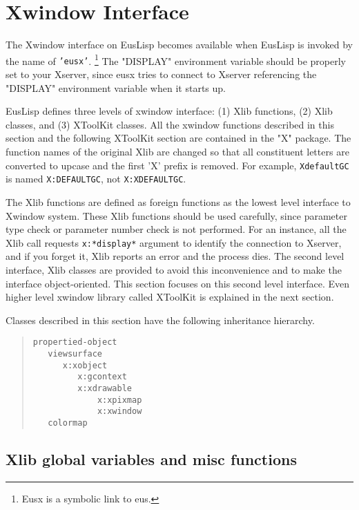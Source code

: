 \section{Xwindow Interface}
The Xwindow interface on EusLisp becomes available when EusLisp is
invoked by the name of {\tt 'eusx'}.
\footnote{Eusx is a symbolic link to eus.}
The "DISPLAY" environment variable should be properly set to your Xserver,
since eusx tries to connect to Xserver referencing
the "DISPLAY" environment variable when it starts up.

EusLisp defines three levels of xwindow interface:
(1) Xlib functions, (2) Xlib classes, and (3) XToolKit classes.
All the xwindow functions described in this section and the following
XToolKit section are contained in the "X" package.
The function names of the original Xlib are changed so that
all constituent letters are converted to upcase
and the first 'X' prefix is removed.
For example, {\tt XdefaultGC} is named {\tt X:DEFAULTGC},
not {\tt X:XDEFAULTGC}.

The Xlib functions are defined as foreign functions
as the lowest level interface to Xwindow system.
These Xlib functions should be used carefully, 
since parameter type check or parameter number check is not performed.
For an instance, all the Xlib call requests {\tt x:*display*} argument
to identify the connection to Xserver, and if you forget it, Xlib reports
an error and the process dies.
The second level interface, Xlib classes are provided
to avoid this inconvenience and to make the interface object-oriented.
This section focuses on this second level interface.
Even higher level xwindow library called XToolKit is explained 
in the next section.

Classes described in this section have the following inheritance
hierarchy.

\begin{quote}
\begin{verbatim}
propertied-object
   viewsurface
      x:xobject
         x:gcontext
         x:xdrawable
             x:xpixmap
             x:xwindow
   colormap
\end{verbatim}
\end{quote}

\subsection{\label{xvariables}Xlib global variables and misc functions}

